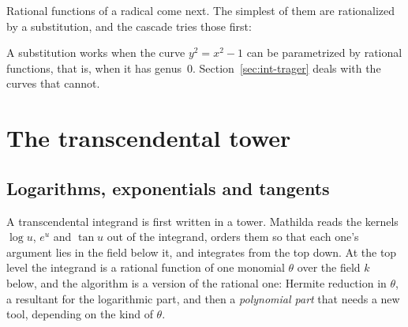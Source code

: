 Rational functions of a radical come next. The simplest of them are rationalized
by a substitution, and the cascade tries those first:

\begin{codepairs}
\end{codepairs}

A substitution works when the curve \(y^2=x^2-1\) can be parametrized by rational
functions, that is, when it has genus~\(0\). Section~\ref{sec:int-trager} deals with
the curves that cannot.

\section{The transcendental tower}
\label{sec:int-tower}

\subsection{Logarithms, exponentials and tangents}
\label{ssec:int-levels}

A transcendental integrand is first written in a tower. Mathilda reads the
kernels \(\log u\), \(e^u\) and \(\tan u\) out of the integrand, orders them so that
each one's argument lies in the field below it, and integrates from the top down.
At the top level the integrand is a rational function of one monomial \(\theta\)
over the field \(k\) below, and the algorithm is a version of the rational one:
Hermite reduction in \(\theta\), a resultant for the logarithmic part, and then a
\emph{polynomial part} that needs a new tool, depending on the kind of \(\theta\).

\begin{codepairs}
\end{codepairs}

